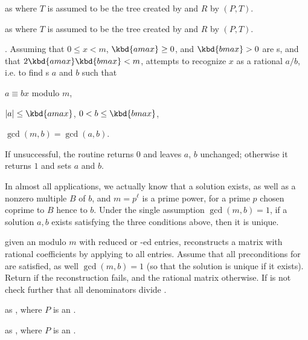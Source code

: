 as  where $T$ is assumed to be the tree created by
 and $R$ by $(P,T)$.

as  where $T$ is assumed to be the tree created by
 and $R$ by $(P,T)$.


.
Assuming that $0 \leq x < m$, $\kbd{amax} \geq 0$, and
$\kbd{bmax} > 0$ are s, and that $2 \kbd{amax} \kbd{bmax} < m$,
attempts to recognize $x$ as a rational $a/b$, i.e. to find s $a$
and $b$ such that

\item $a \equiv b x$ modulo $m$,

\item $|a| \leq \kbd{amax}$, $0 < b \leq \kbd{bmax}$,

\item $\gcd(m,b) = \gcd(a,b)$.

\noindent If unsuccessful, the routine returns $0$ and leaves $a$, $b$
unchanged; otherwise it returns $1$ and sets $a$ and $b$.

In almost all applications, we actually know that a solution exists, as well
as a nonzero multiple $B$ of $b$, and $m = p^\ell$ is a prime power, for a
prime $p$ chosen coprime to $B$ hence to $b$. Under the single assumption
$\gcd(m,b) = 1$, if a solution $a,b$ exists satisfying the three conditions
above, then it is unique.

given an  modulo $m$ with reduced or -ed entries,
reconstructs a matrix with rational coefficients by applying 
to all entries. Assume that all preconditions for  are
satisfied, as well $\gcd(m,b) = 1$ (so that the solution is unique if it
exists). Return  if the reconstruction fails, and the rational
matrix otherwise. If  is not  check further that all
denominators divide .

 as
, where $P$ is an .

 as
, where $P$ is an .

